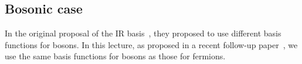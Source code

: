\documentclass[submission, LectureNotes]{SciPost}
\newcommand{\wmax}{\ensuremath{{\omega_\mathrm{max}}}}
\newcommand\ee{\mathrm{e}}%
\newcommand\ii{\mathrm{i}}%
\newcommand\iw{\ii\omega}%
\begin{document}
\subsection{Bosonic case}
In the original proposal of the IR basis~\cite{Shinaoka:2017ix,Chikano:2018gd},
they proposed to use different basis functions for bosons.
In this lecture, as proposed in a recent follow-up paper~\cite{kaye2021discrete},
we use the same basis functions for bosons as those for fermions.
\end{document}
